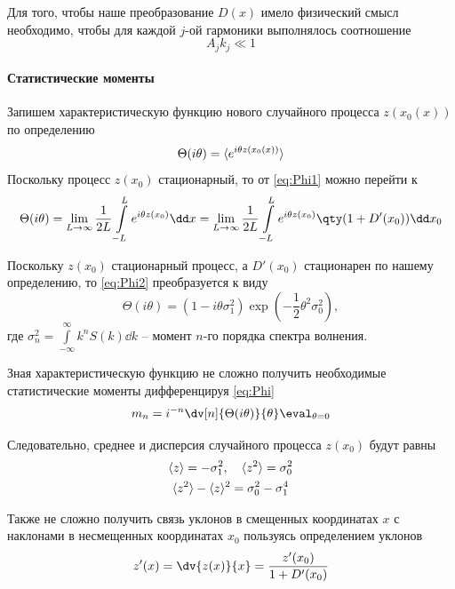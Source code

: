 Для того, чтобы наше преобразование $D(x)$ имело физический смысл
необходимо, чтобы для каждой $j$-ой гармоники выполнялось соотношение 
\begin{equation}
    A_j k_j \ll 1 
\end{equation}

\paragraph{Статистические моменты}%

Запишем характеристическую функцию нового случайного процесса $z(x_0(x))$ по
определению
 \begin{equation}
    \label{eq:Phi1}
    \Theta(i\theta) = \langle e^{i \theta z(x_0(x))}\rangle
\end{equation}
Поскольку процесс $z(x_0)$ стационарный, то от \eqref{eq:Phi1} можно перейти к
\begin{equation}
    \label{eq:Phi2}
    \Theta(i\theta) = \lim_{L \to \infty} \frac{1}{2L} \int\limits_{-L}^{L} e^{i \theta z(x_0)
    }\dd x = 
    \lim_{L \to \infty} \frac{1}{2L} \int\limits_{-L}^{L} e^{i \theta z(x_0)} \qty( 1 + D'(x_0) ) \dd x_0
\end{equation}

Поскольку $z(x_0)$ стационарный процесс, а  $D'(x_0)$ стационарен по нашему
определению, то  \eqref{eq:Phi2} преобразуется к виду
\begin{equation}
    \label{eq:Phi}
    \Theta(i\theta) = (1 - i \theta \sigma_1^2) 
    \exp(-\frac{1}{2} \theta^2 \sigma_0^2),
\end{equation}
где $\sigma^2_n = \int\limits_{-\infty}^{\infty}  k^n S(k) \dd k$ -- момент
$n$-го порядка спектра волнения.

Зная характеристическую функцию не сложно получить необходимые статистические
моменты дифференцируя \eqref{eq:Phi}
\begin{equation}
    m_n = i^{-n} \dv[n]{\Theta(i\theta)}{\theta} \eval_{\theta = 0}
\end{equation}

Следовательно, среднее и дисперсия случайного процесса $z(x_0)$ будут
равны
\begin{gather}
    \langle z\rangle = - \sigma_1^2, \quad \langle z^2\rangle = \sigma_0^2 \\
    \langle z^2\rangle - \langle z\rangle^2 = \sigma_0^2 - \sigma_1^4
\end{gather}

Также не сложно получить связь уклонов в смещенных координатах $x$ с наклонами
в несмещенных координатах $x_0$ пользуясь определением уклонов
 \begin{equation}
    z'(x) = \dv{z(x)}{x} = \frac{z'(x_0)}{1 + D'(x_0)}
\end{equation}



